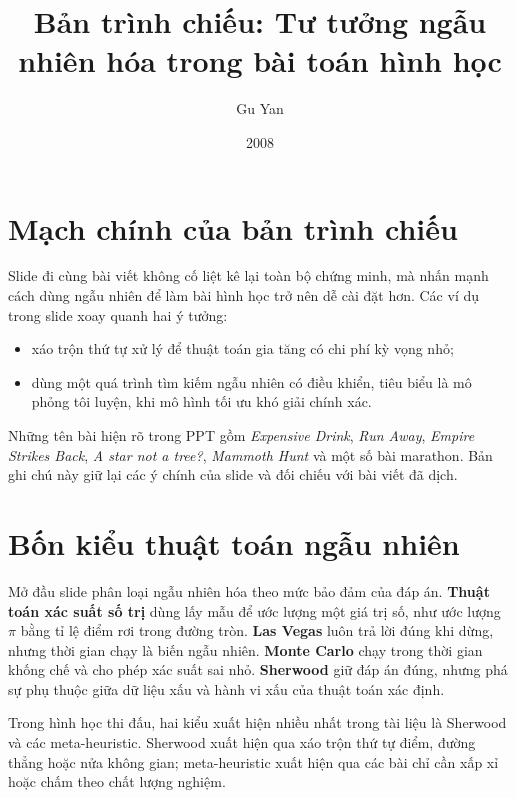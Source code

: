 \documentclass[11pt]{article}
\title{Bản trình chiếu: Tư tưởng ngẫu nhiên hóa trong bài toán hình học}
\author{Gu Yan}
\date{2008}
\begin{document}
\maketitle


\section{Mạch chính của bản trình chiếu}

Slide đi cùng bài viết không cố liệt kê lại toàn bộ chứng minh, mà nhấn mạnh
cách dùng ngẫu nhiên để làm bài hình học trở nên dễ cài đặt hơn. Các ví dụ
trong slide xoay quanh hai ý tưởng:
\begin{itemize}
  \item xáo trộn thứ tự xử lý để thuật toán gia tăng có chi phí kỳ vọng nhỏ;
  \item dùng một quá trình tìm kiếm ngẫu nhiên có điều khiển, tiêu biểu là
  mô phỏng tôi luyện, khi mô hình tối ưu khó giải chính xác.
\end{itemize}
Những tên bài hiện rõ trong PPT gồm \textit{Expensive Drink}, \textit{Run
Away}, \textit{Empire Strikes Back}, \textit{A star not a tree?},
\textit{Mammoth Hunt} và một số bài marathon. Bản ghi chú này giữ lại các ý
chính của slide và đối chiếu với bài viết đã dịch.

\section{Bốn kiểu thuật toán ngẫu nhiên}

Mở đầu slide phân loại ngẫu nhiên hóa theo mức bảo đảm của đáp án.
\textbf{Thuật toán xác suất số trị} dùng lấy mẫu để ước lượng một giá trị số,
như ước lượng \(\pi\) bằng tỉ lệ điểm rơi trong đường tròn. \textbf{Las Vegas}
luôn trả lời đúng khi dừng, nhưng thời gian chạy là biến ngẫu nhiên.
\textbf{Monte Carlo} chạy trong thời gian khống chế và cho phép xác suất sai
nhỏ. \textbf{Sherwood} giữ đáp án đúng, nhưng phá sự phụ thuộc giữa dữ liệu xấu
và hành vi xấu của thuật toán xác định.

Trong hình học thi đấu, hai kiểu xuất hiện nhiều nhất trong tài liệu là
Sherwood và các meta-heuristic. Sherwood xuất hiện qua xáo trộn thứ tự điểm,
đường thẳng hoặc nửa không gian; meta-heuristic xuất hiện qua các bài chỉ cần
xấp xỉ hoặc chấm theo chất lượng nghiệm.
\end{document}

